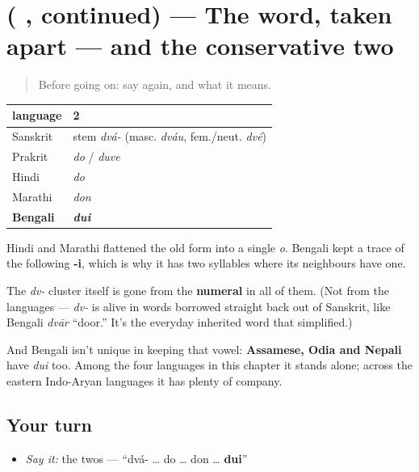 \section[\texorpdfstring{(\bn{এক} \bn{দুই} \bn{তিন} \bn{চার} \bn{পাঁচ}, continued)}{(এক দুই তিন চার পাঁচ, continued)}]{(    , continued) — The word, taken apart —  and the conservative two}

\label{lesson:BN-C06-numbers-1-5-dui}



\begin{quote}
Before going on: say \textbf{    } again, and what it means.
\end{quote}

\begin{cousinweb}
\noindent
\begin{tabularx}{\linewidth}{@{}>{\raggedright\arraybackslash}X>{\raggedright\arraybackslash}X@{}}
\toprule
\textbf{language} & \textbf{2} \\
\midrule
Sanskrit & stem \emph{dvá-} (masc. \emph{dváu}, fem./neut. \emph{dvé}) \\
Prakrit & \emph{do} / \emph{duve} \\
Hindi & \emph{do} \\
Marathi & \emph{don} \\
\textbf{Bengali} & \emph{\textbf{dui}} \\
\bottomrule
\end{tabularx}

Hindi and Marathi flattened the old form into a single \emph{o}. Bengali kept a trace of the following \textbf{-i}, which is why it has two syllables where its neighbours have one.

The \emph{dv-} cluster itself is gone from the \textbf{numeral} in all of them. (Not from the languages — \emph{dv-} is alive in words borrowed straight back out of Sanskrit, like Bengali \textbf{} \emph{dvār} \textquotedblleft{}door.\textquotedblright{} It's the everyday inherited word that simplified.)

And Bengali isn't unique in keeping that vowel: \textbf{Assamese, Odia and Nepali} have \emph{dui} too. Among the four languages in this chapter it stands alone; across the eastern Indo-Aryan languages it has plenty of company.
\end{cousinweb}

\subsection*{Your turn}
\begin{itemize}
\raggedright
  \item \emph{Say it:} the twos — \textquotedblleft{}dvá- … do … don … \textbf{dui}\textquotedblright{}
\end{itemize}


